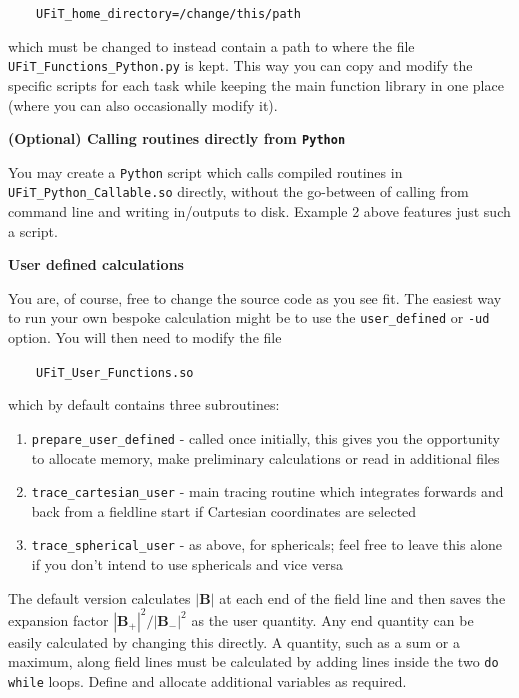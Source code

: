 \documentclass[12pt,twoside]{article}
\begin{document}
$\quad\quad$\texttt{UFiT\_home\_directory=\textquotesingle /change/this/path\textquotesingle }

which must be changed to instead contain a path to where the file \texttt{UFiT\_Functions\_Python.py} is kept. This way you can copy and modify the specific scripts for each task while keeping the main function library in one place (where you can also occasionally modify it).


\vspace{2mm}
{\large \textbf{(Optional) Calling routines directly from \texttt{Python}}}

You may create a \texttt{Python} script which calls compiled routines in \texttt{UFiT\_Python\_Callable.so} directly, without the go-between of calling from command line and writing in/outputs to disk. Example 2 above features just such a script.


\vspace{2mm}
{\Large \textbf{User defined calculations}}

You are, of course, free to change the source code as you see fit. The easiest way to run your own bespoke calculation might be to use the \texttt{user\_defined} or \texttt{-ud} option. You will then need to modify the file 

$\quad\quad$\texttt{UFiT\_User\_Functions.so}

which by default contains three subroutines:
\begin{enumerate}
\item\texttt{prepare\_user\_defined} - called once initially, this gives you the opportunity to allocate memory, make preliminary calculations or read in additional files

\item\texttt{trace\_cartesian\_user} - main tracing routine which integrates forwards and back from a fieldline start if Cartesian coordinates are selected

\item\texttt{trace\_spherical\_user} - as above, for sphericals; feel free to leave this alone if you don't intend to use sphericals and vice versa
\end{enumerate}

The default version calculates $|\mathbf{B}|$ at each end of the field line and then saves the expansion factor $|\mathbf{B}_+|^2/|\mathbf{B}_-|^2$ as the user quantity. Any end quantity can be easily calculated by changing this directly. A quantity, such as a sum or a maximum, along field lines must be calculated by adding lines inside the two \texttt{do while} loops. Define and allocate additional variables as required.
\end{document}
